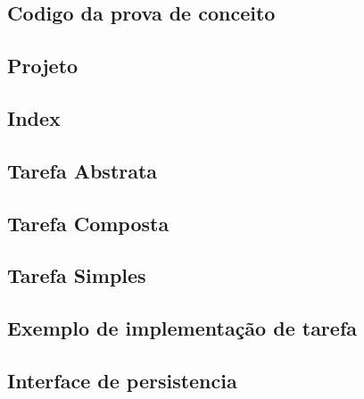 \documentclass[12pt]{tcc}
\begin{document}
\label{bibpage}
\renewcommand\bibname{Referências}

%

\label{bibfinalpage}

\label{lastpage}

\begin{appendices}
\section{Codigo da prova de conceito}

\subsection{Projeto}


\subsection{Index}


\subsection{Tarefa Abstrata}


\subsection{Tarefa Composta}


\subsection{Tarefa Simples}


\subsection{Exemplo de implementação de tarefa}


\subsection{Interface de persistencia}



\end{appendices}
\end{document}
